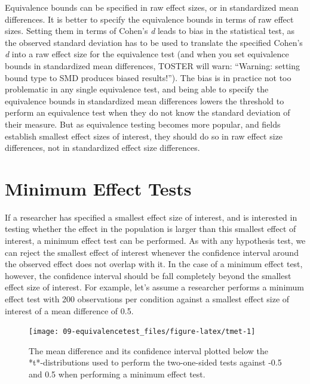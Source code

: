 \documentclass[
  oneside]{book}
\begin{document}
Equivalence bounds can be specified in raw effect sizes, or in standardized mean differences. It is better to specify the equivalence bounds in terms of raw effect sizes. Setting them in terms of Cohen's \emph{d} leads to bias in the statistical test, as the observed standard deviation has to be used to translate the specified Cohen's \emph{d} into a raw effect size for the equivalence test (and when you set equivalence bounds in standardized mean differences, TOSTER will warn: ``Warning: setting bound type to SMD produces biased results!''). The bias is in practice not too problematic in any single equivalence test, and being able to specify the equivalence bounds in standardized mean differences lowers the threshold to perform an equivalence test when they do not know the standard deviation of their measure. But as equivalence testing becomes more popular, and fields establish smallest effect sizes of interest, they should do so in raw effect size differences, not in standardized effect size differences.

\hypertarget{MET}{%
\section{Minimum Effect Tests}\label{MET}}

If a researcher has specified a smallest effect size of interest, and is interested in testing whether the effect in the population is larger than this smallest effect of interest, a minimum effect test can be performed. As with any hypothesis test, we can reject the smallest effect of interest whenever the confidence interval around the observed effect does not overlap with it. In the case of a minimum effect test, however, the confidence interval should be fall completely beyond the smallest effect size of interest. For example, let's assume a researcher performs a minimum effect test with 200 observations per condition against a smallest effect size of interest of a mean difference of 0.5.

\begin{figure}

{\centering \texttt{[image: 09-equivalencetest\_files/figure-latex/tmet-1]} 

}

\caption{The mean difference and its confidence interval plotted below the *t*-distributions used to perform the two-one-sided tests against -0.5 and 0.5 when performing a minimum effect test.}\label{fig:tmet}
\end{figure}
\end{document}
